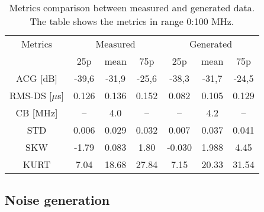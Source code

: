 \renewcommand{\arraystretch}{1.7} %
\begin{table}[t]
	\scriptsize %
	\centering
	\caption{Metrics comparison between measured and generated data. The table shows the metrics in range 0:100 MHz.}
	\begin{tabular}{c|*3c|*3c} 
		\toprule
		Metrics
		          & \multicolumn{3}{c}{Measured}  & \multicolumn{3}{c}{Generated} \\
                        & 25p   & mean & 75p        & 25p   & mean & 75p      \\
		\midrule
		ACG [dB]        & -39,6 &	-31,9&	-25,6   & -38,3&	-31,7&	-24,5 \\ \hline
		RMS-DS [$\mu$s] & 0.126 &	0.136&	0.152   & 0.082&	0.105&	0.129 \\ \hline
        CB [MHz]        & --    &   4.0  & --       &  --  &  4.2    &    --  \\ \hline
        STD             & 0.006 & 0.029  &	0.032   & 0.007 &	0.037 &	0.041 \\ \hline
        SKW             & -1.79 &	0.083&	1.80    & -0.030&	1.988 &	4.45  \\ \hline
        KURT            & 7.04  &	18.68&	27.84   & 7.15  &	20.33 &	31.54 \\ 
		\bottomrule	
	\end{tabular}	
	\label{tab:plc_metrics_comparison}
\end{table}

\subsection{Noise generation}
\label{subsec:plc_noise}

